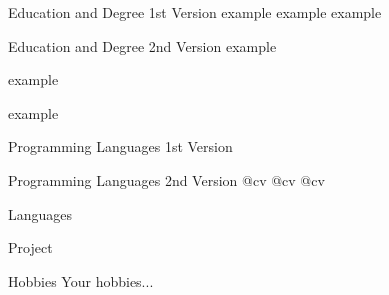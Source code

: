 \documentclass[a4paper,11pt,noweblinkbox=true,eventconfortaa]{dmCV}
\begin{document}
\name{}
\surname{}
\birth{\where{} \when{}}
\email{}
\gender{}
\nationality{}
\personaldata
\begin{eventfree}{Education and Degree 1st Version}
  {\scriptsize example}
\eventdone
{}
  {\scriptsize example}
\eventdone
{}
  {\scriptsize example} 
 \eventdone
\end{eventfree}

\begin{eventlist}{Education and Degree 2nd Version}
  {\scriptsize example}

  {\scriptsize example}

  {\scriptsize example} 

\end{eventlist}


\begin{eventlist}{Programming Languages 1st Version}
\end{eventlist}

\begin{eventfree}{Programming Languages 2nd Version}
@cv
\eventdone
{}
@cv
\eventdone
{} 
@cv
\eventdone
\end{eventfree}

\begin{eventlist}{Languages}
\end{eventlist}

\begin{eventlist}{Project}
  \item 
  \item
  \item
  \item
\end{eventlist}
\begin{eventfree}{Hobbies}
Your hobbies...
\end{eventfree}
\end{document}
